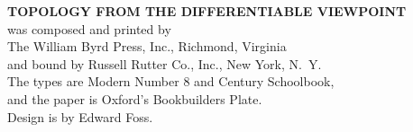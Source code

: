 


\clearpage
\begin{center}
\vspace*{2in}
\textbf{TOPOLOGY FROM THE DIFFERENTIABLE VIEWPOINT}\\[1.5em]
was composed and printed by\\
The William Byrd Press, Inc., Richmond, Virginia\\
and bound by Russell Rutter Co., Inc., New York, N.~Y.\\
The types are Modern Number 8 and Century Schoolbook,\\
and the paper is Oxford's Bookbuilders Plate.\\
Design is by Edward Foss.
\vspace*{2in}
\end{center}

